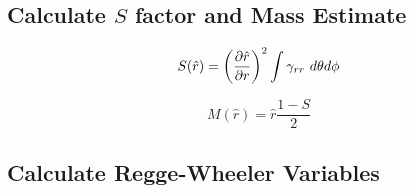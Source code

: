 \documentclass{article}
\begin{document}
\subsection{Calculate $S$ factor and Mass Estimate}

\begin{equation}
S(\hat{r}) = \left(\frac{\partial\hat{r}}{\partial r}\right)^2 \int \gamma_{rr} \ d\theta d\phi
\end{equation}

\begin{equation}
M(\hat{r}) = \hat{r}\frac{1-S}{2}
\end{equation}

\subsection{Calculate Regge-Wheeler Variables}
\end{document}
